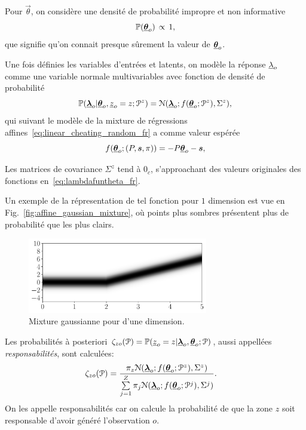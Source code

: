 \documentclass[../main.tex]{subfiles}
\begin{document}
Pour $\vec{\theta}$, on considère une densité de probabilité impropre et non informative~\cite{ChristensenEtAl2010}
\[
  \mathbb{P}({\underline{\boldsymbol{\theta}}}_{o}) \,\propto \,1,
\]
que signifie qu'on connait presque sûrement la valeur de ${\underline{\boldsymbol{\theta}}}_{o}$.

Une fois définies les variables d'entrées et latents, on modèle la réponse $\underline{\lambda}_{o}$ comme une variable normale multivariables avec fonction de densité de probabilité
\begin{equation}
  \label{eq:multivariate_gaussian_fr}
\mathbb{P}({\underline{\boldsymbol{\lambda}}}_{o}|{\underline{\boldsymbol{\theta}}}_{o},\underline{z}_{o}=z; \mathcal{P}^{z}) = \mathcal{N}({\underline{\boldsymbol{\lambda}}}_{o};f({\underline{\boldsymbol{\theta}}}_{o};\mathcal{P}^{z}),{\Sigma^{z}}),
\end{equation}
qui suivant le modèle de la mixture de régressions affines~\eqref{eq:linear_cheating_random_fr} a comme valeur espérée
\begin{equation}
  f({\underline{\boldsymbol{\theta}}}_{o};(P,\boldsymbol{s},\pi))=-{P}{\underline{\boldsymbol{\theta}}}_{o}-{\boldsymbol{s}},
\end{equation}

Les matrices de covariance $\Sigma^{z}$ tend à $0_{c}$, s'approachant des valeurs originales des fonctions en~\eqref{eq:lambdafuntheta_fr}.

Un exemple de la répresentation de tel fonction pour $1$ dimension est vue en Fig.~\ref{fig:affine_gaussian_mixture}, où points plus sombres présentent plus de probabilité que les plus clairs.
\begin{figure}[h]
  \centering
  \includegraphics[width=0.7\textwidth]{../img/resilient_ineq/pwa.pdf}
  \caption{Mixture gaussianne pour \pwa{} d'une dimension.}\label{fig:affine_gaussian_mixture_fr}
\end{figure}

Les probabilités à posteriori $\zeta_{zo}(\mathcal{P})=\mathbb{P}(\underline{z}_{o}=z|{\underline{\boldsymbol{\lambda}}}_{o},{\underline{\boldsymbol{\theta}}}_{o};\mathcal{P})$, aussi appellées \emph{responsabilités}, sont calculées:
\begin{align}
  \label{eq:responsibilities_fr}
\zeta_{zo}(\mathcal{P})&=\frac{\pi_{z}{\mathcal{N}({\underline{\boldsymbol{\lambda}}}_{o};f({\underline{\boldsymbol{\theta}}}_{o};\mathcal{P}^{z}),{\Sigma^{z}})}}{\sum\limits_{j=1}^{Z}\pi_{j}\mathcal{N}({\underline{\boldsymbol{\lambda}}}_{o};f({\underline{\boldsymbol{\theta}}}_{o};\mathcal{P}^{j}),{\Sigma^{j}})}.
\end{align}
On les appelle responsabilités car on calcule la probabilité de que la zone $z$ soit responsable d'avoir généré l'observation $o$.
\end{document}
